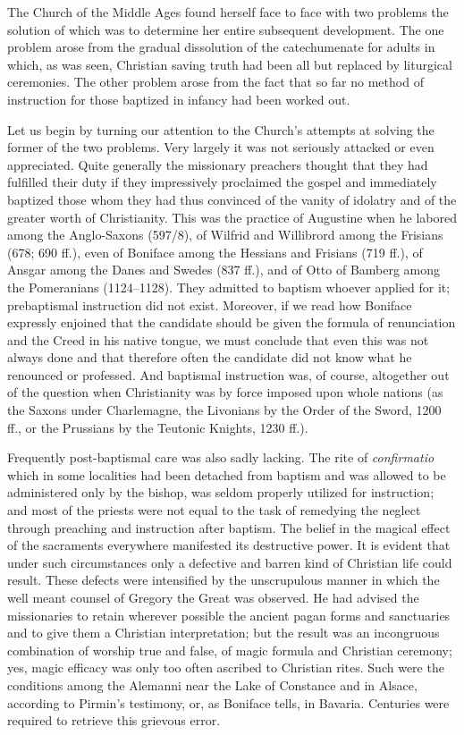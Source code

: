 The Church of the Middle Ages found herself face to face with two problems the solution of which was to determine her entire subsequent development. The one problem arose from the gradual dissolution of the catechumenate for adults in which, as was seen, Christian saving truth had been all but replaced by liturgical ceremonies. The other problem arose from the fact that so far no method of instruction for those baptized in infancy had been worked out.

Let us begin by turning our attention to the Church’s attempts at solving the former of the two problems. Very largely it was not seriously attacked or even appreciated. Quite generally the missionary preachers thought that they had fulfilled their duty if they impressively proclaimed the gospel and immediately baptized those whom they had thus convinced of the vanity of idolatry and of the greater worth of Christianity. This was the practice of Augustine when he labored among the Anglo-Saxons (597/8), of Wilfrid and Willibrord among the Frisians (678; 690 ff.), even of Boniface among the Hessians and Frisians (719 ff.), of Ansgar among the Danes and Swedes (837 ff.), and of Otto of Bamberg among the Pomeranians (1124–1128). They admitted to baptism whoever applied for it; prebaptismal instruction did not exist. Moreover, if we read how Boniface expressly enjoined that the candidate should be given the formula of renunciation and the Creed in his native tongue, we must conclude that even this was not always done and that therefore often the candidate did not know what he renounced or professed. And baptismal instruction was, of course, altogether out of the question when Christianity was by force imposed upon whole nations (as the Saxons under Charlemagne, the Livonians by the Order of the Sword, 1200 ff., or the Prussians by the Teutonic Knights, 1230 ff.).

Frequently post-baptismal care was also sadly lacking. The rite of \emph{confirmatio} which in some localities had been detached from baptism and was allowed to be administered only by the bishop, was seldom properly utilized for instruction; and most of the priests were not equal to the task of remedying the neglect through preaching and instruction after baptism. The belief in the magical effect of the sacraments everywhere manifested its destructive power. It is evident that under such circumstances only a defective and barren kind of Christian life could result. These defects were intensified by the unscrupulous manner in which the well meant counsel of Gregory the Great was observed. He had advised the missionaries to retain wherever possible the ancient pagan forms and sanctuaries and to give them a Christian interpretation; but the result was an incongruous combination of worship true and false, of magic formula and Christian ceremony; yes, magic efficacy was only too often ascribed to Christian rites. Such were the conditions among the Alemanni near the Lake of Constance and in Alsace, according to Pirmin’s testimony, or, as Boniface tells, in Bavaria. Centuries were required to retrieve this grievous error.

